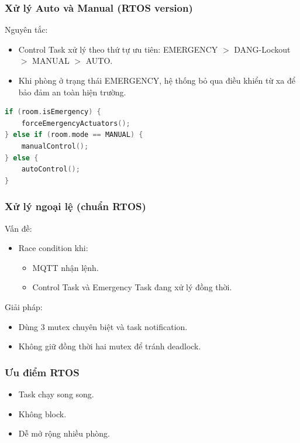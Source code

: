 \documentclass[../BTL_PTIT.tex]{subfiles}
\begin{document}
\subsubsection{Xử lý Auto và Manual (RTOS version)}
Nguyên tắc:
\begin{itemize}[label=\textbullet]
    \item Control Task xử lý theo thứ tự ưu tiên: EMERGENCY $>$ DANG-Lockout $>$ MANUAL $>$ AUTO.
    \item Khi phòng ở trạng thái EMERGENCY, hệ thống bỏ qua điều khiển từ xa để bảo đảm an toàn hiện trường.
\end{itemize}

\begin{lstlisting}[language=C]
if (room.isEmergency) {
    forceEmergencyActuators();
} else if (room.mode == MANUAL) {
    manualControl();
} else {
    autoControl();
}
\end{lstlisting}

\subsubsection{Xử lý ngoại lệ (chuẩn RTOS)}
Vấn đề:
\begin{itemize}[label=\textbullet]
    \item Race condition khi:
    \begin{itemize}[label=--]
        \item MQTT nhận lệnh.
        \item Control Task và Emergency Task đang xử lý đồng thời.
    \end{itemize}
\end{itemize}

Giải pháp:
\begin{itemize}[label=\textbullet]
    \item Dùng 3 mutex chuyên biệt và task notification.
    \item Không giữ đồng thời hai mutex để tránh deadlock.
\end{itemize}

\subsubsection{Ưu điểm RTOS}
\begin{itemize}[label=\textbullet]
    \item Task chạy song song.
    \item Không block.
    \item Dễ mở rộng nhiều phòng.
\end{itemize}
\end{document}
